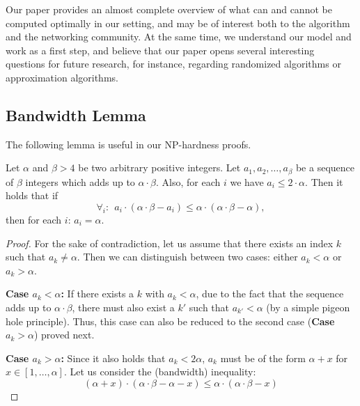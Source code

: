 \documentclass[9pt,twocolumn]{scrartcl}
\newcommand{\clauses}{\alpha}
\newcommand{\variables}{\beta}
\begin{document}
Our paper provides an almost complete overview of what can and cannot be
computed optimally in our setting, and may be of interest both to the algorithm
and the networking community. At the same time, we understand our model and work
as a first step, and believe that our paper opens several interesting
questions for future research, for instance, regarding randomized algorithms
or approximation algorithms.


%



\begin{appendix}


\section{Bandwidth Lemma}

The following lemma is useful in our NP-hardness proofs.

\begin{lemma}\label{lem:bandwidth-lemma}
  Let $\clauses$ and $\variables > 4$ be two arbitrary positive integers. Let $a_1, a_2, \ldots,
  a_{\variables}$ be a sequence of $\variables$ integers which adds up to $\clauses \cdot \variables$. Also, for
  each $i$ we have $a_i \leq 2 \cdot \clauses$. Then it holds that if
  $$ \forall_i:~~ a_i \cdot (\clauses \cdot \variables - a_i) \leq \clauses \cdot (\clauses \cdot \variables -
  \clauses), $$
\noindent  then for each $i$: $a_i = \clauses$.
\end{lemma}
\begin{proof}
For the sake of contradiction, let us assume that there exists an index $k$ such that
$a_k \neq \clauses$. Then we can distinguish between two cases:
either $a_k<\clauses$ or
$a_k>\clauses$.

\textbf{Case $a_k<\clauses$:} If there exists a $k$ with $a_k<\clauses$,
due to the fact that the sequence adds up to $\clauses \cdot \variables$,
there must also exist a $k'$ such that $a_{k'}<\clauses$ (by a simple
pigeon hole principle). Thus, this case can
also be reduced to the second case (\textbf{Case $a_k>\clauses$}) proved
next.

\textbf{Case $a_k>\clauses$:} Since it also holds that $a_k < 2\clauses$,
$a_k$ must be of the form $\clauses + x$ for $x \in [1, \ldots, \clauses]$.
Let us consider the (bandwidth) inequality:
$$ (\clauses + x) \cdot (\clauses \cdot \variables - \clauses - x) \leq \clauses \cdot (\clauses \cdot \variables - x) $$


\end{proof}
\end{appendix}
\end{document}
